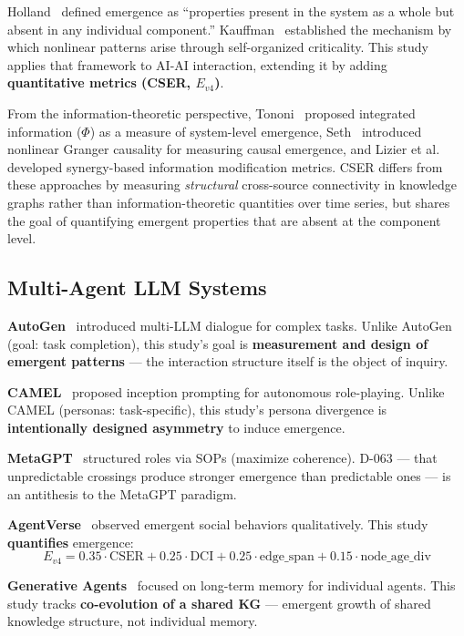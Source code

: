\documentclass[12pt]{article}
\begin{document}
Holland~\cite{holland1998emergence} defined emergence as ``properties present in the system
as a whole but absent in any individual component.''
Kauffman~\cite{kauffman1993origins} established the mechanism by which nonlinear patterns
arise through self-organized criticality. This study applies that framework to AI-AI
interaction, extending it by adding \textbf{quantitative metrics (CSER, $E_{v4}$)}.

From the information-theoretic perspective, Tononi~\cite{tononi2004} proposed integrated
information ($\Phi$) as a measure of system-level emergence, Seth~\cite{seth2010} introduced
nonlinear Granger causality for measuring causal emergence, and
Lizier et al.~\cite{lizier2012} developed synergy-based information modification metrics.
CSER differs from these approaches by measuring \emph{structural} cross-source connectivity
in knowledge graphs rather than information-theoretic quantities over time series, but
shares the goal of quantifying emergent properties that are absent at the component level.

\subsection{Multi-Agent LLM Systems}

\textbf{AutoGen}~\cite{wu2023autogen} introduced multi-LLM dialogue for complex tasks.
Unlike AutoGen (goal: task completion), this study's goal is \textbf{measurement and design
of emergent patterns} --- the interaction structure itself is the object of inquiry.

\textbf{CAMEL}~\cite{li2023camel} proposed inception prompting for autonomous role-playing.
Unlike CAMEL (personas: task-specific), this study's persona divergence is
\textbf{intentionally designed asymmetry} to induce emergence.

\textbf{MetaGPT}~\cite{hong2023metagpt} structured roles via SOPs (maximize coherence).
D-063 --- that unpredictable crossings produce stronger emergence than predictable ones ---
is an antithesis to the MetaGPT paradigm.

\textbf{AgentVerse}~\cite{chen2023agentverse} observed emergent social behaviors
qualitatively. This study \textbf{quantifies} emergence:
\[
  E_{v4} = 0.35 \cdot \text{CSER} + 0.25 \cdot \text{DCI}
            + 0.25 \cdot \text{edge\_span} + 0.15 \cdot \text{node\_age\_div}
\]

\textbf{Generative Agents}~\cite{park2023generative} focused on long-term memory for
individual agents. This study tracks \textbf{co-evolution of a shared KG} --- emergent
growth of shared knowledge structure, not individual memory.
\end{document}
